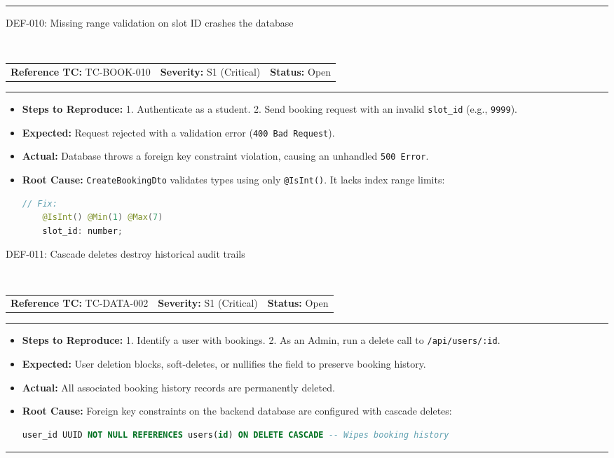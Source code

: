 \documentclass[11pt,a4paper]{article}
\makeatletter
\newcommand{\defectheader}[5]{%
    \needspace{6\baselineskip}
    \noindent\colorbox{primaryblue}{\parbox{\dimexpr\textwidth-2\fboxsep\relax}{
        \color{white}\bfseries\large\strut #1: #2
    }}
    \nopagebreak\\
    \noindent\begin{tabularx}{\textwidth}{@{}X X X@{}}
        \textbf{Reference TC:} #3 & \textbf{Severity:} #4 & \textbf{Status:} #5 \\
    \end{tabularx}
    \nopagebreak\vspace{0.1cm}
    \nopagebreak\hrule\vspace{0.2cm}
}
\makeatother
\begin{document}
\vspace{0.4cm}\hrule\vspace{0.4cm}

\defectheader{DEF-010}{Missing range validation on slot ID crashes the database}{TC-BOOK-010}{S1 (Critical)}{Open}
\begin{itemize}[noitemsep,topsep=1pt,leftmargin=0.5cm]
    \item \textbf{Steps to Reproduce:} 
    1. Authenticate as a student. 2. Send booking request with an invalid \texttt{slot\_id} (e.g., \texttt{9999}).
    \item \textbf{Expected:} Request rejected with a validation error (\texttt{400 Bad Request}).
    \item \textbf{Actual:} Database throws a foreign key constraint violation, causing an unhandled \texttt{500 Error}.
    \item \textbf{Root Cause:} \texttt{CreateBookingDto} validates types using only \texttt{@IsInt()}. It lacks index range limits:
    \begin{lstlisting}[language=Java]
    // Fix:
    @IsInt() @Min(1) @Max(7)
    slot_id: number;
    \end{lstlisting}
\end{itemize}

\newpage

\defectheader{DEF-011}{Cascade deletes destroy historical audit trails}{TC-DATA-002}{S1 (Critical)}{Open}
\begin{itemize}[noitemsep,topsep=1pt,leftmargin=0.5cm]
    \item \textbf{Steps to Reproduce:} 
    1. Identify a user with bookings. 2. As an Admin, run a delete call to \texttt{/api/users/:id}.
    \item \textbf{Expected:} User deletion blocks, soft-deletes, or nullifies the field to preserve booking history.
    \item \textbf{Actual:} All associated booking history records are permanently deleted.
    \item \textbf{Root Cause:} Foreign key constraints on the backend database are configured with cascade deletes:
    \begin{lstlisting}[language=SQL]
    user_id UUID NOT NULL REFERENCES users(id) ON DELETE CASCADE -- Wipes booking history
    \end{lstlisting}
\end{itemize}

\vspace{0.4cm}\hrule\vspace{0.4cm}
\end{document}
